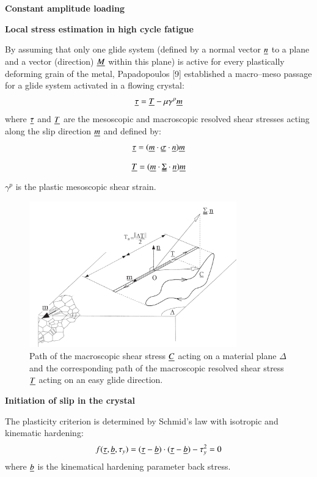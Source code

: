 \documentclass[3p,times,procedia,number]{elsarticle}
\begin{document}
\textbf{Constant amplitude loading}
\vspace{6pt}

\textbf{Local stress estimation in high cycle fatigue}

By assuming that only one glide system (defined by a normal vector $\uline{n}$ to a plane and a vector
(direction) $\uline{M}$ within this plane) is active for every plastically deforming grain of the metal, Papadopoulos [9]
established a macro–meso passage for a glide system activated in a flowing crystal:
\begin{equation}
\uline{\tau}=\uline{T}-\mu\gamma^p\uline{m}
\label{macromeso}
\end{equation}
where $\uline{\tau}$ and $\uline{T}$ are the mesoscopic and macroscopic
resolved shear stresses acting along the slip direction $\uline{m}$ and defined by:
\begin{equation}
\uline{\tau}=(\uline{m}\cdot\uuline{\sigma}\cdot\uline{n})\uline{m}
\label{tau}
\end{equation}
\begin{equation}
\uline{T}=(\uline{m}\cdot\uuline{\Sigma}\cdot\uline{n})\uline{m}
\label{T}
\end{equation}
$\gamma^p$  is the plastic mesoscopic shear strain.
\begin{figure}[h!]
	\centering
	\includegraphics[width=0.8\textwidth]{figures//glid.png} 
	\caption{Path of the macroscopic shear stress $\uline{C}$ acting on a material plane $\Delta$ and the corresponding path of the macroscopic resolved shear stress $\uline{T}$ acting on an easy glide direction.}
	\label{glid}
\end{figure}

\textbf{Initiation of slip in the crystal}

The plasticity criterion is determined by Schmid's law with isotropic and kinematic hardening:
\begin{equation}
f(\uline{\tau},\uline{b},\tau_y)=(\uline{\tau}-\uline{b})\cdot(\uline{\tau}-\uline{b})-\tau_y^2=0
\label{Schmid}
\end{equation}
where $\uline{b}$ is the kinematical hardening parameter back stress.
\end{document}
